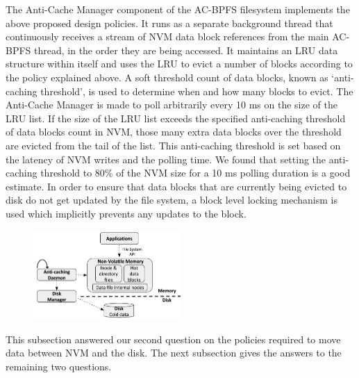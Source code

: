 The Anti-Cache Manager component of the AC-BPFS filesystem implements the above proposed design policies. It runs as a separate background thread that continuously receives a stream of NVM data block references from the main AC-BPFS thread, in the order they are being accessed. It maintains an LRU data structure within itself and uses the LRU to evict a number of blocks according to the policy explained above. A soft threshold count of data blocks, known as `anti-caching threshold', is used to determine when and how many blocks to evict. The Anti-Cache Manager is made to poll arbitrarily every 10 ms on the size of the LRU list. If the size of the LRU list exceeds the specified anti-caching threshold of data blocks count in NVM, those many extra data blocks over the threshold are evicted from the tail of the list. This anti-caching threshold is set based on the latency of NVM writes and the polling time. We found that setting the anti-caching threshold to 80\% of the NVM size for a 10 ms polling duration is a good estimate. In order to ensure that data blocks that are currently being evicted to disk do not get updated by the file system, a block level locking mechanism is used which implicitly prevents any updates to the block.

\begin{figure}
\centering
\vspace{-0.2in}
\includegraphics[width=0.5\textwidth]{figs/bpfs.pdf}
\vspace{-0.2in}
\end{figure}

This subsection answered our second question on the policies required to move data between NVM and the disk. The next subsection gives the answers to the remaining two questions.

